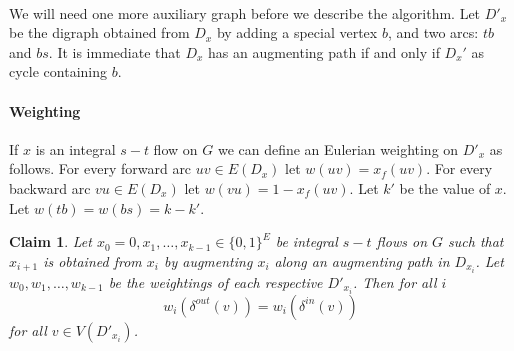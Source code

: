 \documentclass[letterpaper,12pt,oneside,onecolumn]{article}
\newtheorem{claim}[fact]{Claim}
\begin{document}
\paragraph{}
We will need one more auxiliary graph before we describe the algorithm. Let $D'_x$ be the digraph obtained from $D_x$ by adding a special vertex $b$, and two arcs: $tb$ and $bs$. It is immediate that $D_x$ has an augmenting path if and only if $D_x'$ as cycle containing $b$.
\paragraph{Weighting}
If $x$ is an integral $s-t$ flow on $G$ we can define an Eulerian weighting on $D'_x$ as follows. For every forward arc $uv \in E(D_x)$ let $w(uv) = x_f(uv)$. For every backward arc $vu \in E(D_x)$ let $w(vu) = 1- x_f(uv)$. Let $k'$ be the value of $x$. Let $w(tb) = w(bs) = k-k'$.
\begin{claim}
Let $x_0=0,x_1, \dots, x_{k-1}\in \{0,1\}^E$ be integral $s-t$ flows on $G$ such that $x_{i+1}$ is obtained from $x_i$ by augmenting $x_i$ along an augmenting path in $D_{x_i}$. Let $w_0,w_1,\dots, w_{k-1}$ be the weightings of each respective $D'_{x_i}$. Then for all $i$
$$w_i(\delta^{out}(v)) = w_i(\delta^{in}(v))$$ for all $v \in V(D'_{x_i})$.
\end{claim}
\end{document}
